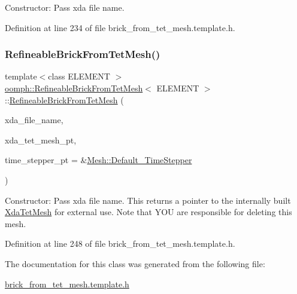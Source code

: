 Constructor\+: Pass xda file name. 



Definition at line 234 of file brick\+\_\+from\+\_\+tet\+\_\+mesh.\+template.\+h.

\mbox{\label{classoomph_1_1RefineableBrickFromTetMesh_a108febc7390d0c449d6dbd4a514c173e}} 
\subsubsection{\texorpdfstring{Refineable\+Brick\+From\+Tet\+Mesh()}{RefineableBrickFromTetMesh()}\hspace{0.1cm}{\footnotesize\ttfamily [2/2]}}
{\footnotesize\ttfamily template$<$class E\+L\+E\+M\+E\+NT $>$ \\
\hyperlink{classoomph_1_1RefineableBrickFromTetMesh}{oomph\+::\+Refineable\+Brick\+From\+Tet\+Mesh}$<$ E\+L\+E\+M\+E\+NT $>$\+::\hyperlink{classoomph_1_1RefineableBrickFromTetMesh}{Refineable\+Brick\+From\+Tet\+Mesh} (\begin{DoxyParamCaption}\item[{const std\+::string}]{xda\+\_\+file\+\_\+name,  }\item[{\hyperlink{classoomph_1_1XdaTetMesh}{Xda\+Tet\+Mesh}$<$ \hyperlink{classoomph_1_1TElement}{T\+Element}$<$ 3, 3 $>$ $>$ $\ast$\&}]{xda\+\_\+tet\+\_\+mesh\+\_\+pt,  }\item[{\hyperlink{classoomph_1_1TimeStepper}{Time\+Stepper} $\ast$}]{time\+\_\+stepper\+\_\+pt = {\ttfamily \&\hyperlink{classoomph_1_1Mesh_a12243d0fee2b1fcee729ee5a4777ea10}{Mesh\+::\+Default\+\_\+\+Time\+Stepper}} }\end{DoxyParamCaption})\hspace{0.3cm}{\ttfamily [inline]}}



Constructor\+: Pass xda file name. This returns a pointer to the internally built \hyperlink{classoomph_1_1XdaTetMesh}{Xda\+Tet\+Mesh} for external use. Note that Y\+OU are responsible for deleting this mesh. 



Definition at line 248 of file brick\+\_\+from\+\_\+tet\+\_\+mesh.\+template.\+h.



The documentation for this class was generated from the following file\+:\begin{DoxyCompactItemize}
\item 
\hyperlink{brick__from__tet__mesh_8template_8h}{brick\+\_\+from\+\_\+tet\+\_\+mesh.\+template.\+h}\end{DoxyCompactItemize}
